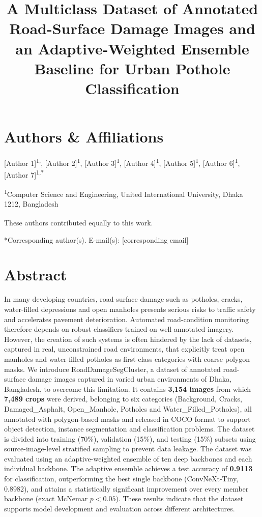 \documentclass{article}
\title{A Multiclass Dataset of Annotated Road-Surface Damage Images and an Adaptive-Weighted Ensemble Baseline for Urban Pothole Classification}
\author{}
\date{}
\begin{document}
\maketitle

\section*{Authors \& Affiliations}
[Author 1]\textsuperscript{1,\textdagger}, 
[Author 2]\textsuperscript{1}, 
[Author 3]\textsuperscript{1}, 
[Author 4]\textsuperscript{1}, 
[Author 5]\textsuperscript{1}, 
[Author 6]\textsuperscript{1},
[Author 7]\textsuperscript{1,*}

\vspace{0.3em}
\noindent
\textsuperscript{1}Computer Science and Engineering, United International University, Dhaka 1212, Bangladesh

\vspace{0.5em}
\noindent
\textsuperscript{\textdagger}These authors contributed equally to this work.

\vspace{0.3em}
\noindent
*Corresponding author(s). E-mail(s): [corresponding email]


\noindent


\section*{Abstract}
In many developing countries, road-surface damage such as potholes, cracks, water-filled depressions and open manholes presents serious risks to traffic safety and accelerates pavement deterioration. Automated road-condition monitoring therefore depends on robust classifiers trained on well-annotated imagery. However, the creation of such systems is often hindered by the lack of datasets, captured in real, unconstrained road environments, that explicitly treat open manholes and water-filled potholes as first-class categories with coarse polygon masks. We introduce RoadDamageSegCluster, a dataset of annotated road-surface damage images captured in varied urban environments of Dhaka, Bangladesh, to overcome this limitation. It contains \textbf{3{,}154 images} from which \textbf{7{,}489 crops} were derived, belonging to six categories (Background, Cracks, Damaged\_Asphalt, Open\_Manhole, Potholes and Water\_Filled\_Potholes), all annotated with polygon-based masks and released in COCO format to support object detection, instance segmentation and classification problems. The dataset is divided into training (70\%), validation (15\%), and testing (15\%) subsets using source-image-level stratified sampling to prevent data leakage. The dataset was evaluated using an adaptive-weighted ensemble of ten deep backbones and each individual backbone. The adaptive ensemble achieves a test accuracy of \textbf{0.9113} for classification, outperforming the best single backbone (ConvNeXt-Tiny, 0.8982), and attains a statistically significant improvement over every member backbone (exact McNemar $p<0.05$). These results indicate that the dataset supports model development and evaluation across different architectures.
\end{document}
